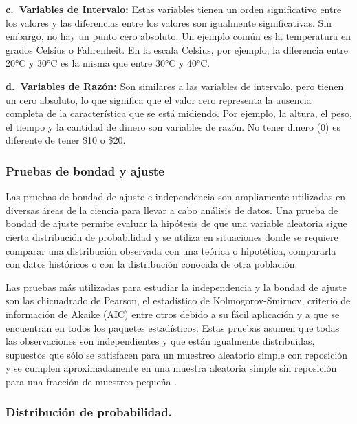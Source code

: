 \documentclass[
  11pt,
  bookmarksnumbered]{article}
\begin{document}
\textbf{c.~Variables de Intervalo:} Estas variables tienen un orden significativo entre los valores y las diferencias entre los valores son igualmente significativas.
Sin embargo, no hay un punto cero absoluto.
Un ejemplo común es la temperatura en grados Celsius o Fahrenheit.
En la escala Celsius, por ejemplo, la diferencia entre 20°C y 30°C es la misma que entre 30°C y 40°C.

\textbf{d.~Variables de Razón:} Son similares a las variables de intervalo, pero tienen un cero absoluto, lo que significa que el valor cero representa la ausencia completa de la característica que se está midiendo.
Por ejemplo, la altura, el peso, el tiempo y la cantidad de dinero son variables de razón.
No tener dinero (0) es diferente de tener \$10 o \$20.

\hypertarget{pruebas-de-bondad-y-ajuste}{%
\subsubsection{Pruebas de bondad y ajuste}\label{pruebas-de-bondad-y-ajuste}}

Las pruebas de bondad de ajuste e independencia son ampliamente utilizadas en diversas áreas de la ciencia para llevar a cabo análisis de datos.
Una prueba de bondad de ajuste permite evaluar la hipótesis de que una variable aleatoria sigue cierta distribución de probabilidad y se utiliza en situaciones donde se requiere comparar una distribución observada con una teórica o hipotética, compararla con datos históricos o con la distribución conocida de otra población.

Las pruebas más utilizadas para estudiar la independencia y la bondad de ajuste son las chicuadrado de Pearson, el estadístico de Kolmogorov-Smirnov, criterio de información de Akaike (AIC) entre otros debido a su fácil aplicación y a que se encuentran en todos los paquetes estadísticos.
Estas pruebas asumen que todas las observaciones son independientes y que están igualmente distribuidas, supuestos que sólo se satisfacen para un muestreo aleatorio simple con reposición y se cumplen aproximadamente en una muestra aleatoria simple sin reposición para una fracción de muestreo pequeña \textcite{QuinteroM2014}.

\hypertarget{distribuciuxf3n-de-probabilidad.}{%
\subsubsection{Distribución de probabilidad.}\label{distribuciuxf3n-de-probabilidad.}}
\end{document}
